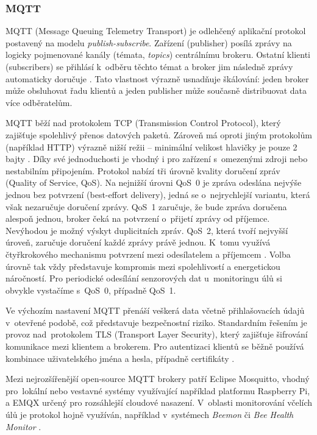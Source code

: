 \subsubsection*{MQTT}
MQTT (Message Queuing Telemetry Transport) je odlehčený aplikační protokol postavený na modelu \textit{publish-subscribe}. Zařízení (publisher) posílá zprávy na logicky pojmenované kanály (témata, \textit{topics}) centrálnímu brokeru. Ostatní klienti (subscribers) se přihlásí k~odběru těchto témat a broker jim následně zprávy automaticky doručuje \cite{MQTTvsHTTP}. Tato vlastnost výrazně usnadňuje škálování: jeden broker může obsluhovat řadu klientů a jeden publisher může současně distribuovat data více odběratelům. 

MQTT běží nad protokolem TCP (Transmission Control Protocol), který zajišťuje spolehlivý přenos datových paketů. Zároveň má oproti jiným protokolům (například HTTP) výrazně nižší režii -- minimální velikost hlavičky je pouze 2 bajty \cite{MQTTvsCoAP}. Díky své jednoduchosti je vhodný i pro zařízení s~omezenými zdroji nebo nestabilním připojením. Protokol nabízí tři úrovně kvality doručení zpráv (Quality of Service, QoS). Na nejnižší úrovni QoS~0 je zpráva odeslána nejvýše jednou bez potvrzení (best-effort delivery), jedná se o~nejrychlejší variantu, která však nezaručuje doručení zprávy. QoS~1 zaručuje, že bude zpráva doručena alespoň jednou, broker čeká na potvrzení o~přijetí zprávy od příjemce. Nevýhodou je možný výskyt duplicitních zpráv. QoS~2, která tvoří nejvyšší úroveň, zaručuje doručení každé zprávy právě jednou. K~tomu využívá čtyřkrokového mechanismu potvrzení mezi odesílatelem a příjemcem \cite{MQTT-QoS}. Volba úrovně tak vždy představuje kompromis mezi spolehlivostí a energetickou náročností. Pro periodické odesílání senzorových dat u~monitoringu úlů si obvykle vystačíme s~QoS~0, případně QoS~1. 

Ve výchozím nastavení MQTT přenáší veškerá data včetně přihlašovacích údajů v~otevřené podobě, což představuje bezpečnostní riziko. Standardním řešením je provoz nad~protokolem TLS (Transport Layer Security), který zajišťuje šifrování komunikace mezi klientem a brokerem. Pro autentizaci klientů se běžně používá kombinace uživatelského jména a hesla, případně certifikáty \cite{MQTTsecurity}.

Mezi nejrozšířenější open-source MQTT brokery patří Eclipse Mosquitto, vhodný pro~lokální nebo vestavné systémy využívající například platformu Raspberry Pi, a EMQX určený pro rozsáhlejší cloudové nasazení. V~oblasti monitorování včelích úlů je protokol hojně využíván, například v~systémech \textit{Beemon} \cite{Beemon2021} či \textit{Bee Health Monitor} \cite{Nevlacil2023}.

